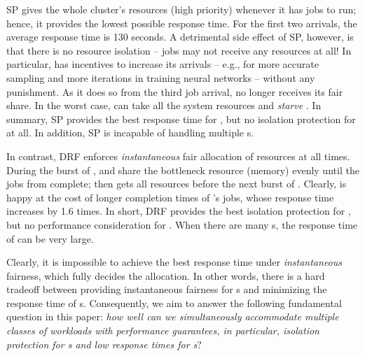 SP gives \burstq the whole cluster's resources (high priority) whenever it has jobs to run; hence, it provides the lowest possible response time. 
For the first two arrivals, the average response time is 130 seconds. 
A detrimental side effect of SP, however, is that there is no resource isolation -- \batchq jobs may not receive any resources at all! 
In particular, \burstq has incentives to increase its arrivals -- e.g., for more accurate sampling and more iterations in training neural networks -- without any punishment. 
As it does so from the third job arrival, \batchq no longer receives its fair share. 
In the worst case, \burstq can take all the system resources and \emph{starve} \batchq. 
In summary, SP provides the best response time for \burstq , but no isolation protection for \batchq at all.
In addition, SP is incapable of handling multiple {\burstq}s. 

In contrast, DRF enforces \emph{instantaneous} fair allocation of resources at all times. 
During the burst of \burstq , \burstq  and \batchq share the bottleneck resource (memory) evenly until the jobs from \burstq  complete; then \batchq gets all resources before the next burst of \burstq . 
Clearly, \batchq is happy at the cost of longer completion times of \burstq 's jobs, whose response time increases by 1.6 times. 
In short, DRF provides the best isolation protection for \batchq, but no performance consideration for \burstq . 
When there are many {\batchq}s, the response time of \burstq  can be very large. 

Clearly, it is impossible to achieve the best response time under \emph{instantaneous} fairness, which fully decides the allocation. 
In other words, there is a hard tradeoff between providing instantaneous fairness for {\batchq}s and minimizing the response time of {\burstq}s.
Consequently, we aim to answer the following fundamental question in this paper: \emph{how well can we simultaneously accommodate multiple classes of workloads with performance guarantees, in particular, isolation protection for {\batchq}s and low response times for {\burstq}s}? 

